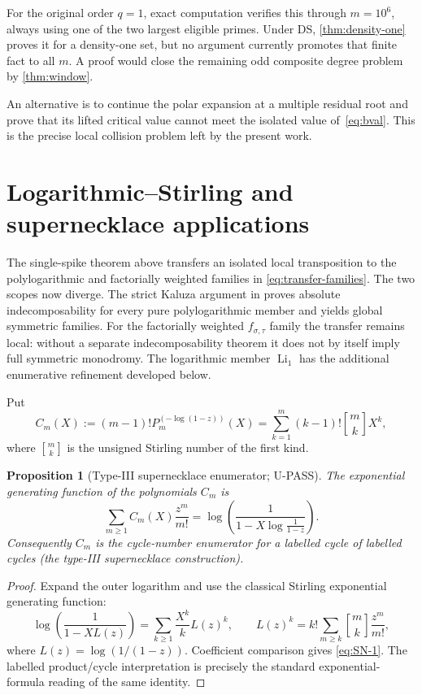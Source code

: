 \documentclass[11pt]{article}
\theoremstyle{keio}
\newtheorem{proposition}[theorem]{Proposition}
\theoremstyle{definition}
\theoremstyle{remark}
\newcommand{\stirling}[2]{\genfrac{[}{]}{0pt}{}{#1}{#2}}
\newcommand{\UPASS}{\textcolor{keiogreen}{\textsf{U-PASS}}}
\begin{document}
For the original order $q=1$, exact computation verifies this through
$m=10^6$, always using one of the two largest eligible primes. Under DS,
\cref{thm:density-one} proves it for a density-one set, but no argument
currently promotes that finite fact to all $m$. A proof would close the
remaining odd composite degree problem by \cref{thm:window}.

An alternative is to continue the polar expansion at a multiple residual
root and prove that its lifted critical value cannot meet the isolated value
of~\eqref{eq:bval}. This is the precise local collision problem left by the
present work.
\section{Logarithmic--Stirling and supernecklace applications}
\label{sec:supernecklace}

The single-spike theorem above transfers an isolated local transposition to
the polylogarithmic and factorially weighted families in
\eqref{eq:transfer-families}.  The two scopes now diverge.  The strict Kaluza
argument in  proves absolute indecomposability for
every pure polylogarithmic member and yields global symmetric families.  For
the factorially weighted $f_{\sigma,\tau}$ family the transfer remains local:
without a separate indecomposability theorem it does not by itself imply full
symmetric monodromy.  The logarithmic member $\operatorname{Li}_1$ has the
additional enumerative refinement developed below.

Put
\[
 C_m(X):=(m-1)!P_m^{(-\log(1-z))}(X)
 =\sum_{k=1}^m (k-1)!\stirling{m}{k}X^k,
 \tag{SN-1}\label{eq:SN-1}
\]
where \(\stirling{m}{k}\) is the unsigned Stirling number of the first kind.

\begin{proposition}[Type-III supernecklace enumerator; \UPASS]
The exponential generating function of the polynomials \(C_m\) is
\[
 \boxed{\displaystyle
 \sum_{m\ge1}C_m(X)\frac{z^m}{m!}
 =\log\!\left(\frac{1}{1-X\log\frac1{1-z}}\right).}
 \tag{SN-2}
\]
Consequently \(C_m\) is the cycle-number enumerator for a labelled cycle of
labelled cycles (the type-III supernecklace construction).
\end{proposition}

\begin{proof}
Expand the outer logarithm and use the classical Stirling exponential
generating function:
\[
 \log\!\left(\frac1{1-X L(z)}\right)
 =\sum_{k\ge1}\frac{X^k}{k}L(z)^k,
 \qquad
 L(z)^k=k!\sum_{m\ge k}\stirling{m}{k}\frac{z^m}{m!},
\]
where \(L(z)=\log(1/(1-z))\).  Coefficient comparison gives
\eqref{eq:SN-1}.  The labelled product/cycle interpretation is precisely the
standard exponential-formula reading of the same identity.
\end{proof}
\end{document}
